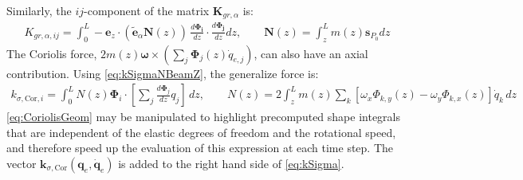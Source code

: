 \documentclass[wes, manuscript]{copernicus}
\renewcommand{\v}[1]{\boldsymbol{#1}}
\newcommand{\m}[1]{\boldsymbol{#1}}
\begin{document}
Similarly, the $ij$-component of the matrix $\m{K}_{gr,\alpha}$ is:
\begin{align}
   K_{gr,\alpha,ij} = \int_0^L -\v{e}_z\cdot\left(\tilde{\v{e}}_\alpha \v{N}(z) \right)
   \, \frac{d\v{\Phi_i}}{dz}\cdot\frac{d\v{\Phi_j}}{dz} dz, 
   \qquad
   \v{N}(z) =  \int_z^L m(z) \v{s}_{P_0} dz
\end{align}
The Coriolis force, $2 m(z) \v{\omega} \times (\sum_j \v{\Phi}_j(z) \dot{q}_{e,j})$, can also have an axial contribution. Using \autoref{eq:kSigmaNBeamZ}, the generalize force is:
\begin{align}
    k_{\sigma,\text{Cor},i}=\int_0^L N(z) \v{\Phi}_i\cdot \left[\sum_j\frac{d\v{\Phi}_j}{dz} q_j \right]\, dz
        ,\qquad
        N(z) = 2 \int_z^L m(z) \sum_k \left[   \omega_x\Phi_{k,y}(z)-\omega_y\Phi_{k,x}(z)\right] \dot{q}_k \, dz
        \label{eq:CoriolisGeom}
\end{align}
\autoref{eq:CoriolisGeom} may be manipulated to highlight precomputed shape integrals that are independent of the elastic degrees of freedom and the rotational speed, and therefore speed up the evaluation of this expression at each time step. The vector $\v{k}_{\sigma,\text{Cor}}(\v{q}_e, \v{\dot{q}}_e)$ is added to the right hand side of \autoref{eq:kSigma}.



\end{document}
